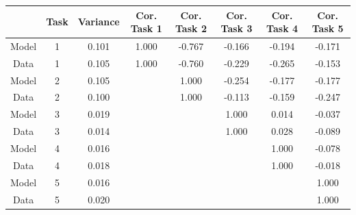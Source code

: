 
\centering
\begin{tabular}[t]{cccccccc}
\toprule
 & Task & Variance & Cor. Task 1 & Cor. Task 2 & Cor. Task 3 & Cor. Task 4 & Cor. Task 5\\
\midrule
Model & 1 & 0.101 & 1.000 & -0.767 & -0.166 & -0.194 & -0.171\\
Data & 1 & 0.105 & 1.000 & -0.760 & -0.229 & -0.265 & -0.153\\
Model & 2 & 0.105 &  & 1.000 & -0.254 & -0.177 & -0.177\\
Data & 2 & 0.100 &  & 1.000 & -0.113 & -0.159 & -0.247\\
Model & 3 & 0.019 &  &  & 1.000 & 0.014 & -0.037\\
Data & 3 & 0.014 &  &  & 1.000 & 0.028 & -0.089\\
Model & 4 & 0.016 &  &  &  & 1.000 & -0.078\\
Data & 4 & 0.018 &  &  &  & 1.000 & -0.018\\
Model & 5 & 0.016 &  &  &  &  & 1.000\\
Data & 5 & 0.020 &  &  &  &  & 1.000\\
\bottomrule
\end{tabular}